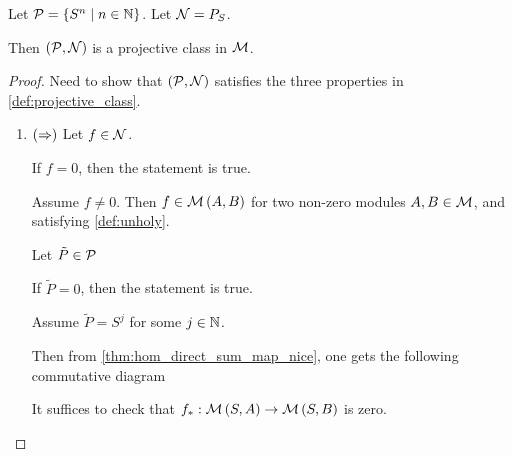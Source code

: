 \begin{example} %
    Let \( {\mathcal{P}} = \left\{  S^n \mid n \in {\mathbb{N}}  \right\} \). Let \( {\mathcal{N}} = P_S \).

    Then \( \left(  {\mathcal{P}}, {\mathcal{N}} \right) \) is a projective class in \( {\mathcal{M}} \).
\end{example}
\begin{proof}
    Need to show that \( \left(  {\mathcal{P}}, {\mathcal{N}}  \right) \) satisfies the three properties in \autoref{def:projective_class}.

    \begin{enumerate}
        \item {
            \( \left(  \Rightarrow  \right) \) Let \( f \in {\mathcal{N}} \).

            If \( f = 0 \), then the statement is true.

            Assume \( f \neq 0 \). Then \( f \in {\mathcal{M}}\left( A, B \right) \) for two non-zero modules \( A, B \in {\mathcal{M}} \), and satisfying \autoref{def:unholy}.
            
            Let \( \tilde{P} \in {\mathcal{P}} \)
            
            If \( \tilde{P} = 0 \), then the statement is true.

            Assume \( \tilde{P} = S^j \) for some \( j \in {\mathbb{N}} \).

            Then from \autoref{thm:hom_direct_sum_map_nice}, one gets the following commutative diagram
            \begin{center}
            \end{center}
            It suffices to check that \( f_*: {\mathcal{M}}\left( S, A \right) \to {\mathcal{M}}\left( S, B \right) \) is zero.

}
\end{enumerate}
\end{proof}
